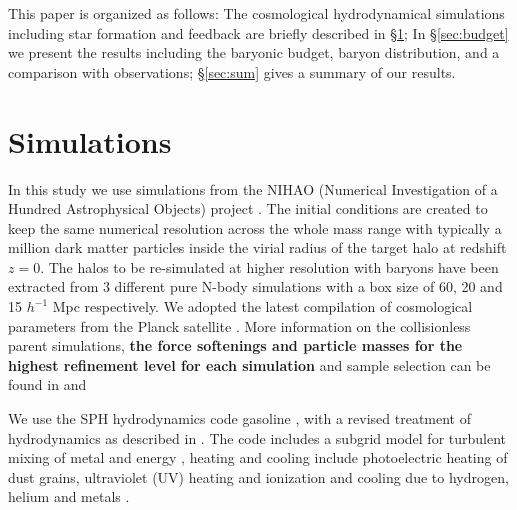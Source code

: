 \documentclass[useAMS,usenatbib]{mn2e}
\begin{document}
This paper is organized as follows: The cosmological hydrodynamical
simulations including star formation and feedback are briefly
described in  \S\ref{sec:sims}; In \S\ref{sec:budget} we present the
results including the baryonic budget, baryon distribution, and a
comparison with observations; \S\ref{sec:sum} gives a summary of our
results.




\section{Simulations} 
\label{sec:sims}

In this study we use simulations from the NIHAO (Numerical
Investigation of a Hundred Astrophysical Objects) project \citep{Wang15}.  
The initial conditions are created to keep the same numerical
resolution across the whole mass range with typically a million dark
matter particles inside the virial radius of the target halo at 
redshift $z=0$.  The halos to be re-simulated at higher resolution
with baryons have been extracted from 3 different pure N-body
simulations with a box size of 60, 20 and 15 $h^{-1}$ Mpc
respectively.  We adopted the  latest compilation of cosmological
parameters from the Planck  satellite \citep{Planck14}. 
More information on the collisionless parent simulations,
{\bf the force softenings and particle masses for the highest 
refinement level for each simulation} and
sample  selection can be found in \citet{Dutton14} and \citet{Wang15}

We use the SPH hydrodynamics code {\sc gasoline} \citep{Wadsley04},
with a revised treatment of  hydrodynamics as described in
\citet{Keller14}.  The code includes a subgrid model for turbulent
mixing of metal and energy \citep{Wadsley08}, heating and cooling
include photoelectric heating of dust grains, ultraviolet (UV) heating
and ionization and  cooling due to hydrogen, helium and metals
\citep{Shen10}.  
\end{document}
